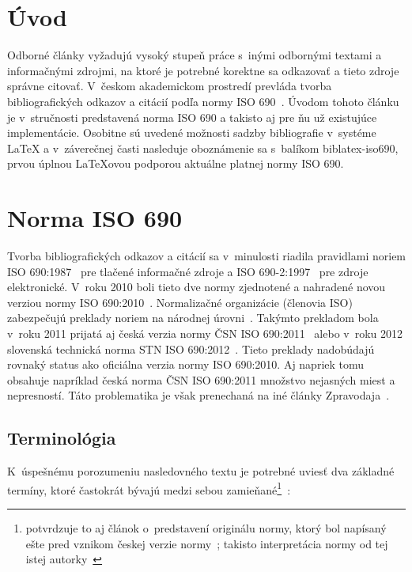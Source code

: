 \documentclass{csbulletin}
\begin{document}
\begin{refsection}

\section{Úvod}

Odborné články vyžadujú vysoký stupeň práce s~inými odbornými textami a informačnými zdrojmi, na ktoré je potrebné korektne sa odkazovať a tieto zdroje správne citovať. V~českom akademickom prostredí prevláda tvorba bibliografických odkazov a citácií podľa normy ISO 690~\cite{Kratochvil2011}. Úvodom tohoto článku je v~stručnosti predstavená norma ISO 690 a takisto aj pre ňu už existujúce implementácie. Osobitne sú uvedené možnosti sadzby bibliografie v~systéme \LaTeX{} a v~záverečnej časti nasleduje oboznámenie sa s~balíkom \textsf{biblatex-iso690}, prvou úplnou \LaTeX{}ovou podporou aktuálne platnej normy ISO 690.


\section{Norma ISO 690}

Tvorba bibliografických odkazov a citácií sa v~minulosti riadila pravidlami noriem ISO 690:1987~\cite{iso690:1987} pre tlačené informačné zdroje a ISO 690-2:1997~\cite{iso690:2:1997} pre zdroje elektronické. V~roku 2010 boli tieto dve normy zjednotené a nahradené novou verziou normy ISO 690:2010~\cite{iso690:2010}. Normalizačné organizácie (členovia ISO) zabezpečujú preklady noriem na národnej úrovni~\cite{isoMembershipManual}. Takýmto prekladom bola v~roku 2011 prijatá aj česká verzia normy ČSN ISO 690:2011~\cite{csn:iso690:2011} alebo v~roku 2012 slovenská technická norma STN ISO 690:2012~\cite{stn:iso690:2012}. Tieto preklady nadobúdajú rovnaký status ako oficiálna verzia normy ISO 690:2010. Aj napriek tomu obsahuje napríklad česká norma ČSN ISO 690:2011 množstvo nejasných miest a nepresností. Táto problematika je však prenechaná na iné články Zpravodaja~\cite{Hala2013}.

\subsection{Terminológia}

K~úspešnému porozumeniu nasledovného textu je potrebné uviesť dva základné termíny, ktoré častokrát bývajú medzi sebou zamieňané\footnote{potvrdzuje to aj článok o~predstavení originálu normy, ktorý bol napísaný ešte pred vznikom českej verzie normy~\cite{Bratkova2010}; takisto interpretácia normy od tej istej autorky~\cite{Bratkova2011}}~\cite{csn:iso690:2011}:


\end{refsection}
\end{document}
